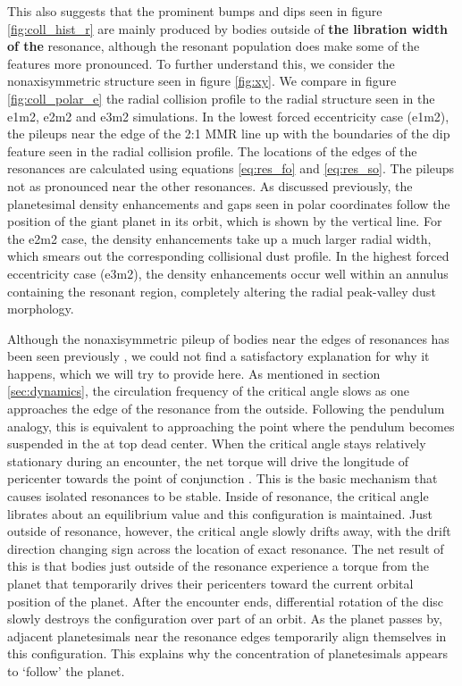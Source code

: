 \documentclass[fleqn,usenatbib]{mnras}
\begin{document}
This also suggests that the prominent bumps and dips seen in figure \ref{fig:coll_hist_r} are mainly produced by bodies outside of \textbf{the libration width of the} resonance, although 
the resonant population does make some of the features more pronounced. To further understand this, we consider the nonaxisymmetric structure 
seen in figure \ref{fig:xy}. We compare in figure \ref{fig:coll_polar_e} the radial collision profile to the radial structure seen in the e1m2, e2m2 and 
e3m2 simulations. In the lowest forced eccentricity case (e1m2), the pileups near the edge of the 2:1 MMR line up with the boundaries of the dip 
feature seen in the radial collision profile. The locations of the edges of the resonances are calculated using equations \ref{eq:res_fo} and 
\ref{eq:res_so}. The pileups not as pronounced near the other resonances. As discussed previously, the planetesimal density enhancements and gaps 
seen in polar coordinates follow the position of the giant planet in its orbit, which is shown by the vertical line. For the e2m2 case, the density 
enhancements take up a much larger radial width, which smears out the corresponding collisional dust profile. In the highest forced eccentricity case 
(e3m2), the density enhancements occur well within an annulus containing the resonant region, completely altering the radial peak-valley dust 
morphology.

Although the nonaxisymmetric pileup of bodies near the edges of resonances has been seen previously 
\citep{2000Icar..143...45R, 2016ApJ...818..159T}, we could not find a satisfactory explanation for why it happens, which we will try to provide here. As 
mentioned in section \ref{sec:dynamics}, the circulation frequency of the critical angle slows as one approaches the edge of the resonance from the 
outside. Following the pendulum analogy, this is equivalent to
approaching the point where the pendulum becomes suspended in the
at top dead center. 
When the critical angle stays relatively stationary during an encounter, the net torque will drive the longitude of pericenter towards the point of 
conjunction \citep{1976ARA&A..14..215P}.  This is the basic mechanism that causes isolated resonances to be stable. Inside of resonance, the critical 
angle librates about an equilibrium value and this configuration is maintained. Just outside of resonance, however, the critical angle slowly drifts away, with the 
drift direction changing sign across the location of exact resonance. The net result of this is that bodies just outside of the resonance experience a torque from 
the planet that temporarily drives their pericenters toward the current orbital position of the planet. After the encounter ends, differential rotation of the disc 
slowly destroys the configuration over part of an orbit. As the planet passes by, adjacent planetesimals near the resonance edges temporarily align 
themselves in this configuration. This explains why the concentration of planetesimals appears to `follow' the planet.
\end{document}
